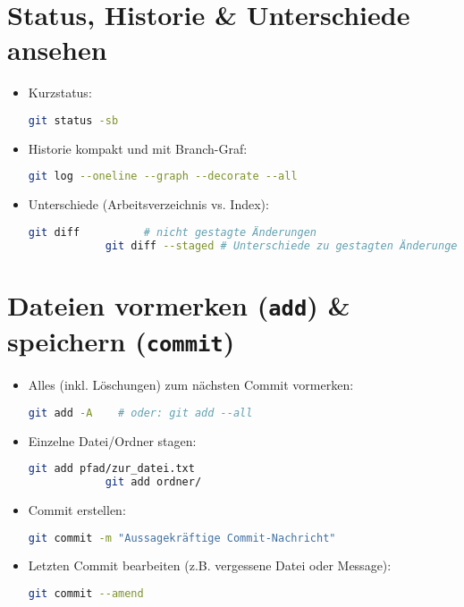 \documentclass[a4paper,11pt]{article}
\begin{document}
	\section{Status, Historie \& Unterschiede ansehen}
	\begin{itemize}
		\item Kurzstatus:
		\begin{lstlisting}[language=bash]
			git status -sb
		\end{lstlisting}
		\item Historie kompakt und mit Branch-Graf:
		\begin{lstlisting}[language=bash]
			git log --oneline --graph --decorate --all
		\end{lstlisting}
		\item Unterschiede (Arbeitsverzeichnis vs. Index):
		\begin{lstlisting}[language=bash]
			git diff          # nicht gestagte Änderungen
			git diff --staged # Unterschiede zu gestagten Änderungen
		\end{lstlisting}
	\end{itemize}
	
	\section{Dateien vormerken (\texttt{add}) \& speichern (\texttt{commit})}
	\begin{itemize}
		\item Alles (inkl. L\"oschungen) zum n\"achsten Commit vormerken:
		\begin{lstlisting}[language=bash]
			git add -A    # oder: git add --all
		\end{lstlisting}
		\item Einzelne Datei/Ordner stagen:
		\begin{lstlisting}[language=bash]
			git add pfad/zur_datei.txt
			git add ordner/
		\end{lstlisting}
		\item Commit erstellen:
		\begin{lstlisting}[language=bash]
			git commit -m "Aussagekräftige Commit-Nachricht"
		\end{lstlisting}
		\item Letzten Commit bearbeiten (z.B. vergessene Datei oder Message):
		\begin{lstlisting}[language=bash]
			git commit --amend
		\end{lstlisting}
	\end{itemize}
	
\end{document}
